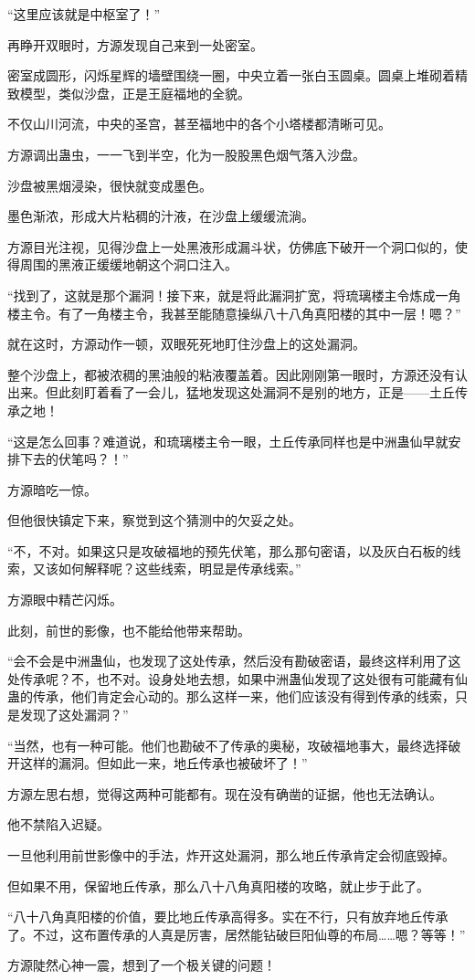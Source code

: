 \begin{this_body}
“这里应该就是中枢室了！”

再睁开双眼时，方源发现自己来到一处密室。

密室成圆形，闪烁星辉的墙壁围绕一圈，中央立着一张白玉圆桌。圆桌上堆砌着精致模型，类似沙盘，正是王庭福地的全貌。

不仅山川河流，中央的圣宫，甚至福地中的各个小塔楼都清晰可见。

方源调出蛊虫，一一飞到半空，化为一股股黑色烟气落入沙盘。

沙盘被黑烟浸染，很快就变成墨色。

墨色渐浓，形成大片粘稠的汁液，在沙盘上缓缓流淌。

方源目光注视，见得沙盘上一处黑液形成漏斗状，仿佛底下破开一个洞口似的，使得周围的黑液正缓缓地朝这个洞口注入。

“找到了，这就是那个漏洞！接下来，就是将此漏洞扩宽，将琉璃楼主令炼成一角楼主令。有了一角楼主令，我甚至能随意操纵八十八角真阳楼的其中一层！嗯？”

就在这时，方源动作一顿，双眼死死地盯住沙盘上的这处漏洞。

整个沙盘上，都被浓稠的黑油般的粘液覆盖着。因此刚刚第一眼时，方源还没有认出来。但此刻盯着看了一会儿，猛地发现这处漏洞不是别的地方，正是——土丘传承之地！

“这是怎么回事？难道说，和琉璃楼主令一眼，土丘传承同样也是中洲蛊仙早就安排下去的伏笔吗？！”

方源暗吃一惊。

但他很快镇定下来，察觉到这个猜测中的欠妥之处。

“不，不对。如果这只是攻破福地的预先伏笔，那么那句密语，以及灰白石板的线索，又该如何解释呢？这些线索，明显是传承线索。”

方源眼中精芒闪烁。

此刻，前世的影像，也不能给他带来帮助。

“会不会是中洲蛊仙，也发现了这处传承，然后没有勘破密语，最终这样利用了这处传承呢？不，也不对。设身处地去想，如果中洲蛊仙发现了这处很有可能藏有仙蛊的传承，他们肯定会心动的。那么这样一来，他们应该没有得到传承的线索，只是发现了这处漏洞？”

“当然，也有一种可能。他们也勘破不了传承的奥秘，攻破福地事大，最终选择破开这样的漏洞。但如此一来，地丘传承也被破坏了！”

方源左思右想，觉得这两种可能都有。现在没有确凿的证据，他也无法确认。

他不禁陷入迟疑。

一旦他利用前世影像中的手法，炸开这处漏洞，那么地丘传承肯定会彻底毁掉。

但如果不用，保留地丘传承，那么八十八角真阳楼的攻略，就止步于此了。

“八十八角真阳楼的价值，要比地丘传承高得多。实在不行，只有放弃地丘传承了。不过，这布置传承的人真是厉害，居然能钻破巨阳仙尊的布局……嗯？等等！”

方源陡然心神一震，想到了一个极关键的问题！

\end{this_body}

